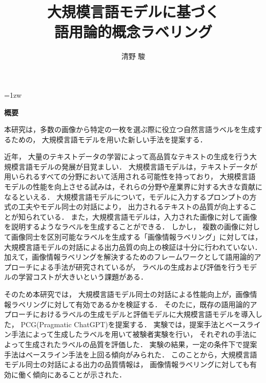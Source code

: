 \documentclass[a4paper,11pt]{jreport}
\title{大規模言語モデルに基づく\\語用論的概念ラベリング}
\author{清野 駿}
\begin{document}
\maketitle
\thispagestyle{empty}
\newpage

\thispagestyle{empty}
\vspace*{20pt plus 1fil}
\parindent=1zw
\noindent
\begin{center}
{\bf 概要}
\vspace{5mm}
\end{center}
本研究は，多数の画像から特定の一枚を選ぶ際に役立つ自然言語ラベルを生成するための，
大規模言語モデルを用いた新しい手法を提案する．

近年，
大量のテキストデータの学習によって高品質なテキストの生成を行う大規模言語モデルの発展が目覚ましい．
大規模言語モデルは，テキストデータが用いられるすべての分野において活用される可能性を持っており，
大規模言語モデルの性能を向上させる試みは，それらの分野や産業界に対する大きな貢献になるといえる．
大規模言語モデルについて，モデルに入力するプロンプトの方式の工夫やモデル同士の対話により，
出力されるテキストの品質が向上することが知られている．
また，大規模言語モデルは，入力された画像に対して画像を説明するようなラベルを生成することができる．
しかし，
複数の画像に対して画像同士を区別可能なラベルを生成する「画像情報ラベリング」に対しては，
大規模言語モデルの対話による出力品質の向上の検証は十分に行われていない．
加えて，画像情報ラベリングを解決するためのフレームワークとして語用論的アプローチによる手法が研究されているが，
ラベルの生成および評価を行うモデルの学習コストが大きいという課題がある．

そのため本研究では，
大規模言語モデル同士の対話による性能向上が，画像情報ラベリングに対して有効であるかを検証する．
そのたに，既存の語用論的アプローチにおけるラベルの生成モデルと評価モデルに大規模言語モデルを導入した，
PCG(Pragmatic ChatGPT)を提案する．
実験では，提案手法とベースライン手法によって生成したラベルを用いて被験者実験を行い，
それぞれの手法によって生成されたラベルの品質を評価した．
実験の結果，一定の条件下で提案手法はベースライン手法を上回る傾向がみられた．
このことから，大規模言語モデル同士の対話による出力の品質情報は，
画像情報ラベリングに対しても有効に働く傾向にあることが示された．

\par
\vspace{0pt plus 1fil}
\newpage

\tableofcontents
\listoffigures
\end{document}
